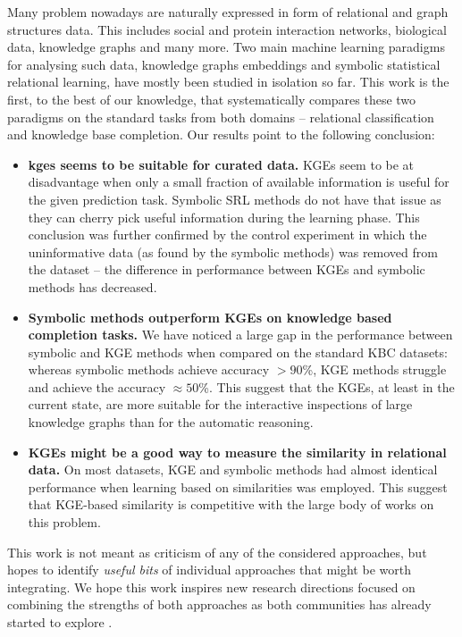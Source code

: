 Many problem nowadays are naturally expressed in form of relational and graph structures data.
This includes social and protein interaction networks, biological data, knowledge graphs and many more.
Two main machine learning paradigms for analysing such data, knowledge graphs embeddings and  symbolic statistical relational learning, have mostly been studied in isolation so far.
This work is the first, to the best of our knowledge, that systematically compares these two paradigms on the standard tasks from both domains -- relational classification and knowledge base completion.
Our results point to the following conclusion:
\begin{itemize}
	\item \textbf{\gls{kge}s seems to be suitable for curated data.}  KGEs seem to be at disadvantage when only a small fraction of available information is useful for the given prediction task. Symbolic SRL methods do not have that issue as they can cherry pick useful information during the learning phase. This conclusion was further confirmed by the control experiment in which the uninformative data (as found by the symbolic methods) was removed from the dataset -- the difference in performance between KGEs and symbolic methods has decreased.
	\item  \textbf{Symbolic methods outperform KGEs on knowledge based completion tasks.} We have noticed a large gap in the performance between symbolic and KGE methods when compared on the standard KBC datasets: whereas symbolic methods achieve accuracy $> 90$\%, KGE methods struggle and achieve the accuracy $\approx 50$\%. This suggest that the KGEs, at least in the current state, are more suitable for the interactive inspections of large knowledge graphs than for the automatic reasoning.
	\item \textbf{KGEs might be a good way to measure the similarity in relational data.} On most datasets, KGE and symbolic methods had almost identical performance when learning based on similarities was employed. This suggest that KGE-based similarity is competitive with the large body of works on this problem.
\end{itemize}

This work is not meant as criticism of any of the considered approaches, but hopes to identify \textit{useful bits} of individual approaches that might be worth integrating.
We hope this work inspires new research directions focused on combining the strengths of both approaches as both communities has already started to explore \cite{DBLP:conf/uai/MinerviniDRR17,demeester2016lifted,Schlichtkrull2017ModelingRD}.












